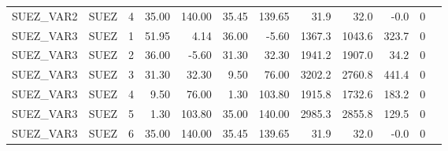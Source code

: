 \begin{tabular}{llrrrrrrrrrl}
SUEZ\_VAR2 &     SUEZ &        4 &     35.00 &    140.00 &   35.45 &  139.65 &    31.9 &   32.0 &             -0.0 &           0 &                                                    \\
SUEZ\_VAR3 &     SUEZ &        1 &     51.95 &      4.14 &   36.00 &   -5.60 &  1367.3 & 1043.6 &            323.7 &           0 &                                                    \\
SUEZ\_VAR3 &     SUEZ &        2 &     36.00 &     -5.60 &   31.30 &   32.30 &  1941.2 & 1907.0 &             34.2 &           0 &                                                    \\
SUEZ\_VAR3 &     SUEZ &        3 &     31.30 &     32.30 &    9.50 &   76.00 &  3202.2 & 2760.8 &            441.4 &           0 &                                                    \\
SUEZ\_VAR3 &     SUEZ &        4 &      9.50 &     76.00 &    1.30 &  103.80 &  1915.8 & 1732.6 &            183.2 &           0 &                                                    \\
SUEZ\_VAR3 &     SUEZ &        5 &      1.30 &    103.80 &   35.00 &  140.00 &  2985.3 & 2855.8 &            129.5 &           0 &                                                    \\
SUEZ\_VAR3 &     SUEZ &        6 &     35.00 &    140.00 &   35.45 &  139.65 &    31.9 &   32.0 &             -0.0 &           0 &                                                    \\
\bottomrule
\end{tabular}
